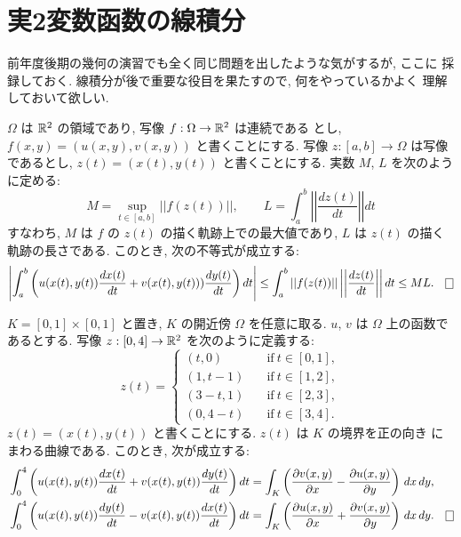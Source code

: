 \documentclass[12pt,twoside]{jarticle}
\begin{document}
\section{実2変数函数の線積分}

前年度後期の幾何の演習でも全く同じ問題を出したような気がするが, ここに
採録しておく. 線積分が後で重要な役目を果たすので, 何をやっているかよく
理解しておいて欲しい.

\begin{question}
  $\Omega$ は ${\mathbb R}^2$ の領域であり, 写像 $f:\Omega\to{\mathbb R}^2$ は連続である
  とし, $f(x,y)=(u(x,y),v(x,y))$ と書くことにする. 写像 
  $z:[a,b]\to\Omega$ は写像であるとし, $z(t)=(x(t),y(t))$ 
  と書くことにする. 実数 $M$, $L$ を次のように定める:
  \[
    M = \sup_{t\in[a,b]}||f(z(t))||,
    \qquad
    L = \int_a^b \left|\left| \frac{dz(t)}{dt} \right|\right| dt
  \]%
  すなわち, $M$ は $f$ の $z(t)$ の描く軌跡上での最大値であり, $L$ は 
  $z(t)$ の描く軌跡の長さである. このとき, 次の不等式が成立する:
  \[
    \left| 
      \int_a^b 
      \left(
        u(x(t),y(t)) \frac{dx(t)}{dt} + v(x(t),y(t))) \frac{dy(t)}{dt}
      \right)
      dt
    \right|
    \le 
    \int_a^b 
      ||f(z(t))||
      \left|\left| \frac{dz(t)}{dt} \right|\right|
    dt
    \le
    ML. \qed
  \]%
\end{question}

\begin{question}\qstar{*}
  $K=[0,1] \times [0,1]$ と置き, $K$ の開近傍 $\Omega$ を任意に取る. 
  $u$, $v$ は $\Omega$ 上の函数であるとする. 写像 
  $z:[0,4]\to{\mathbb R}^2$ を次のように定義する:
  \[
    z(t)=
    \begin{cases}
      (t,0)   \quad & \text{if}\ t\in [0,1], \\
      (1,t-1) \quad & \text{if}\ t\in [1,2], \\
      (3-t,1) \quad & \text{if}\ t\in [2,3], \\
      (0,4-t) \quad & \text{if}\ t\in [3,4].
    \end{cases}
  \]%
  $z(t)=(x(t),y(t))$ と書くことにする.  $z(t)$ は $K$ の境界を正の向き
  にまわる曲線である. このとき, 次が成立する:
  \begin{align*}
    &
    \int_0^4 
    \left( 
      u(x(t),y(t)) \frac{dx(t)}{dt} + v(x(t),y(t)) \frac{dy(t)}{dt}
    \right)
    dt
    =
    \int_K
    \left(
      \frac{\del v(x,y)}{\del x} - \frac{\del u(x,y)}{\del y} 
    \right)
    \,dx\,dy,
    \\
    &
    \int_0^4 
    \left( 
      u(x(t),y(t)) \frac{dy(t)}{dt} - v(x(t),y(t)) \frac{dx(t)}{dt}
    \right)
    dt
    =
    \int_K
    \left(
      \frac{\del u(x,y)}{\del x} + \frac{\del v(x,y)}{\del y} 
    \right)
    \,dx\,dy.  \qed
  \end{align*}
\end{question}
\end{document}
